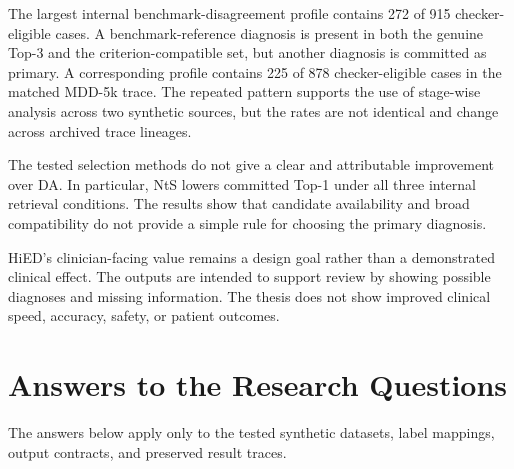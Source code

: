 The largest internal benchmark-disagreement profile contains 272 of 915 checker-eligible cases. A benchmark-reference diagnosis is present in both the genuine Top-3 and the criterion-compatible set, but another diagnosis is committed as primary. A corresponding profile contains 225 of 878 checker-eligible cases in the matched MDD-5k trace. The repeated pattern supports the use of stage-wise analysis across two synthetic sources, but the rates are not identical and change across archived trace lineages.

The tested selection methods do not give a clear and attributable improvement over DA. In particular, NtS lowers committed Top-1 under all three internal retrieval conditions. The results show that candidate availability and broad compatibility do not provide a simple rule for choosing the primary diagnosis.

HiED's clinician-facing value remains a design goal rather than a demonstrated clinical effect. The outputs are intended to support review by showing possible diagnoses and missing information. The thesis does not show improved clinical speed, accuracy, safety, or patient outcomes.

\section{Answers to the Research Questions}

The answers below apply only to the tested synthetic datasets, label mappings, output contracts, and preserved result traces.

